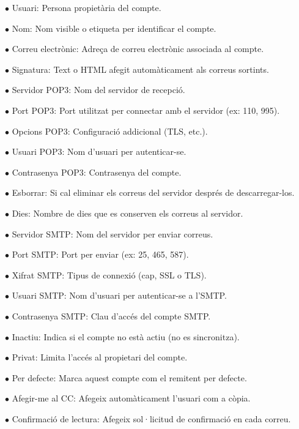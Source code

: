 \documentclass[a4paper]{article}
\begin{document}
\begin{compactitem}
\item[\color{myblue}$\bullet$] Usuari: Persona propietària del compte.
\item[\color{myblue}$\bullet$] Nom: Nom visible o etiqueta per identificar el compte.
\item[\color{myblue}$\bullet$] Correu electrònic: Adreça de correu electrònic associada al compte.
\item[\color{myblue}$\bullet$] Signatura: Text o HTML afegit automàticament als correus sortints.
\item[\color{myblue}$\bullet$] Servidor POP3: Nom del servidor de recepció.
\item[\color{myblue}$\bullet$] Port POP3: Port utilitzat per connectar amb el servidor (ex: 110, 995).
\item[\color{myblue}$\bullet$] Opcions POP3: Configuració addicional (TLS, etc.).
\item[\color{myblue}$\bullet$] Usuari POP3: Nom d'usuari per autenticar-se.
\item[\color{myblue}$\bullet$] Contrasenya POP3: Contrasenya del compte.
\item[\color{myblue}$\bullet$] Esborrar: Si cal eliminar els correus del servidor després de descarregar-los.
\item[\color{myblue}$\bullet$] Dies: Nombre de dies que es conserven els correus al servidor.
\item[\color{myblue}$\bullet$] Servidor SMTP: Nom del servidor per enviar correus.
\item[\color{myblue}$\bullet$] Port SMTP: Port per enviar (ex: 25, 465, 587).
\item[\color{myblue}$\bullet$] Xifrat SMTP: Tipus de connexió (cap, SSL o TLS).
\item[\color{myblue}$\bullet$] Usuari SMTP: Nom d'usuari per autenticar-se a l'SMTP.
\item[\color{myblue}$\bullet$] Contrasenya SMTP: Clau d'accés del compte SMTP.
\item[\color{myblue}$\bullet$] Inactiu: Indica si el compte no està actiu (no es sincronitza).
\item[\color{myblue}$\bullet$] Privat: Limita l'accés al propietari del compte.
\item[\color{myblue}$\bullet$] Per defecte: Marca aquest compte com el remitent per defecte.
\item[\color{myblue}$\bullet$] Afegir-me al CC: Afegeix automàticament l'usuari com a còpia.
\item[\color{myblue}$\bullet$] Confirmació de lectura: Afegeix sol·licitud de confirmació en cada correu.
\end{compactitem}
\end{document}
